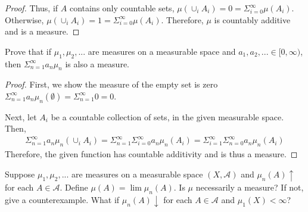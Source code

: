 \documentclass[10pt]{article}
\newenvironment{problem}[2][Problem]{\begin{trivlist}
		\item[\hskip \labelsep {\bfseries #1}\hskip \labelsep {\bfseries #2.}]}{\end{trivlist}}
\begin{document}
\begin{problem}{1}
\begin{problem}{3}
\begin{proof}
				Thus, if $A$ contains only countable sets, $\mu(\cup_i A_i) = 0 = \Sigma_{i=0}^\infty \mu(A_i)$. Otherwise, $\mu(\cup_i A_i) = 1 = \Sigma_{i=0}^\infty \mu(A_i)$. Therefore, $\mu$ is countably additive and is a measure.
			\end{proof}
		\end{problem}
		
		\begin{problem}{5}
			Prove that if $\mu_1, \mu_2 , . . .$ are
			measures on a measurable space and $a_1, a_2 , ... \in [0, \infty)$, then $\Sigma_{n=1}^\infty a_n\mu_n$ is also a measure.
			\begin{proof}
				First, we show the measure of the empty set is zero $\Sigma_{n=1}^\infty a_n\mu_n(\emptyset) = \Sigma_{n=1}^\infty 0 = 0$.
				
				Next, let $A_i$ be a countable collection of sets, in the given measurable space. Then, 
				\begin{align*}
					\Sigma_{n=1}^\infty a_n\mu_n(\cup_i A_i) = \Sigma_{n=1}^\infty \Sigma_{i=0}^\infty a_n\mu_n(A_i) = \Sigma_{i=1}^\infty \Sigma_{n=0}^\infty a_n\mu_n(A_i)
				\end{align*}
				Therefore, the given function has countable additivity and is thus a measure.
			\end{proof}
		\end{problem}
	\end{problem}
	
	\begin{problem}{5}
		Suppose $\mu_1, \mu_2, ...$ are measures on a measurable
		space $(X, \mathcal{A})$ and $\mu_n(A)\uparrow$ for each $A \in \mathcal{A}$. Define
		$\mu(A) = \lim \mu_n(A)$. Is $\mu$ necessarily a measure? If not, give a counterexample. What if $\mu_n(A)\downarrow$ for each $A \in \mathcal{A}$ and $\mu_1(X) < \infty$?
	\end{problem}
	
\end{document}
